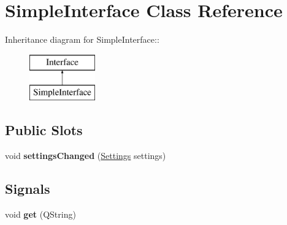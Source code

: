 \hypertarget{classSimpleInterface}{
\section{SimpleInterface Class Reference}
\label{classSimpleInterface}
}
Inheritance diagram for SimpleInterface::\begin{figure}[H]
\begin{center}
\leavevmode
\includegraphics[height=2cm]{classSimpleInterface}
\end{center}
\end{figure}
\subsection*{Public Slots}
\begin{DoxyCompactItemize}
\item 
\hypertarget{classSimpleInterface_a5a879c62260177f25f0d860938725a4f}{
void {\bfseries settingsChanged} (\hyperlink{classSettings}{Settings} settings)}
\label{classSimpleInterface_a5a879c62260177f25f0d860938725a4f}

\end{DoxyCompactItemize}
\subsection*{Signals}
\begin{DoxyCompactItemize}
\item 
\hypertarget{classSimpleInterface_a84d1dcca4469f7b955ce029fd2548c37}{
void {\bfseries get} (QString)}
\label{classSimpleInterface_a84d1dcca4469f7b955ce029fd2548c37}

\end{DoxyCompactItemize}
